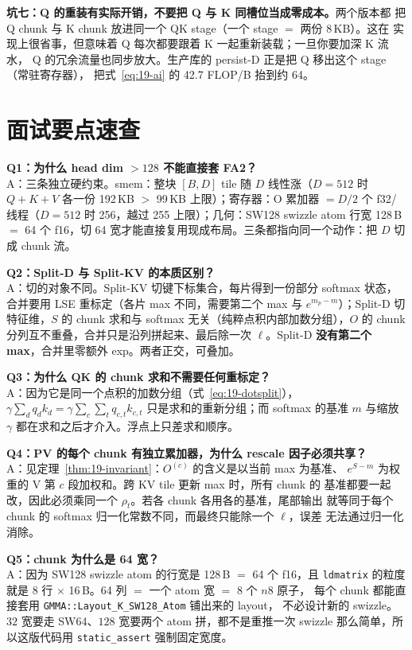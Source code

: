 \textbf{坑七：Q 的重装有实际开销，不要把 Q 与 K 同槽位当成零成本。}两个版本都
把 Q chunk 与 K chunk 放进同一个 QK stage（一个 stage $=$ 两份 8\,KB）。这在
实现上很省事，但意味着 Q 每次都要跟着 K 一起重新装载；一旦你要加深 K 流水，
Q 的冗余流量也同步放大。生产库的 persist-D 正是把 Q 移出这个 stage（常驻寄存器），
把式~\ref{eq:19-ai} 的 42.7 FLOP/B 抬到约 64。

\section{面试要点速查}

\textbf{Q1：为什么 head dim $> 128$ 不能直接套 FA2？}\\
A：三条独立硬约束。smem：整块 $[B,D]$ tile 随 $D$ 线性涨（$D{=}512$ 时
$Q{+}K{+}V$ 各一份 192\,KB $>$ 99\,KB 上限）；寄存器：O 累加器 $= D/2$ 个
f32/线程（$D{=}512$ 时 256，越过 255 上限）；几何：SW128 swizzle atom 行宽
128\,B $=$ 64 个 f16，切 64 宽才能直接复用现成布局。三条都指向同一个动作：把 $D$ 切成 chunk 流。

\textbf{Q2：Split-D 与 Split-KV 的本质区别？}\\
A：切的对象不同。Split-KV 切键下标集合，每片得到一份部分 softmax 状态，
合并要用 LSE 重标定（各片 max 不同，需要第二个 max 与 $e^{m_p-m}$）；Split-D
切特征维，$S$ 的 chunk 求和与 softmax 无关（纯粹点积内部加数分组），$O$ 的
chunk 分列互不重叠，合并只是沿列拼起来、最后除一次 $\ell$。Split-D
\textbf{没有第二个 max}，合并里零额外 exp。两者正交，可叠加。

\textbf{Q3：为什么 QK 的 chunk 求和不需要任何重标定？}\\
A：因为它是同一个点积的加数分组（式~\ref{eq:19-dotsplit}），$\gamma \sum_d q_d k_d
= \gamma \sum_c \sum_{t} q_{c,t} k_{c,t}$ 只是求和的重新分组；而 softmax 的基准
$m$ 与缩放 $\gamma$ 都在求和之后才介入。浮点上只差求和顺序。

\textbf{Q4：PV 的每个 chunk 有独立累加器，为什么 rescale 因子必须共享？}\\
A：见定理~\ref{thm:19-invariant}：$O^{(c)}$ 的含义是以当前 max 为基准、
$e^{S-m}$ 为权重的 V 第 $c$ 段加权和。跨 KV tile 更新 max 时，所有 chunk 的
基准都要一起改，因此必须乘同一个 $\rho_t$。若各 chunk 各用各的基准，尾部输出
就等同于每个 chunk 的 softmax 归一化常数不同，而最终只能除一个 $\ell$，误差
无法通过归一化消除。

\textbf{Q5：chunk 为什么是 64 宽？}\\
A：因为 SW128 swizzle atom 的行宽是 128\,B $=$ 64 个 f16，且 \texttt{ldmatrix}
的粒度就是 8 行 $\times$ 16\,B。64 列 $=$ 一个 atom 宽 $=$ 8 个 $n8$ 原子，
每个 chunk 都能直接套用 \texttt{GMMA::\allowbreak{}Layout\_\allowbreak{}K\_\allowbreak{}SW128\_\allowbreak{}Atom} 铺出来的 layout，
不必设计新的 swizzle。$32$ 宽要走 SW64、$128$ 宽要两个 atom 拼，都不是重推一次
swizzle 那么简单，所以这版代码用 \texttt{static\_\allowbreak{}assert} 强制固定宽度。

